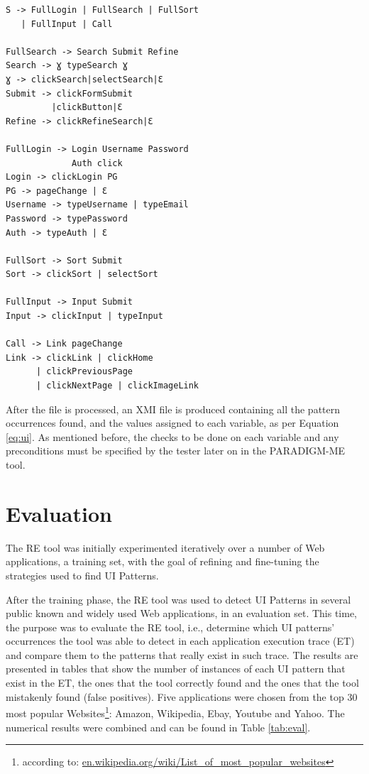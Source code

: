 \documentclass[conference]{IEEEtran}
\begin{document}
\begin{lstlisting}
S -> FullLogin | FullSearch | FullSort 
   | FullInput | Call

FullSearch -> Search Submit Refine
Search -> Ɣ typeSearch Ɣ
Ɣ -> clickSearch|selectSearch|Ɛ
Submit -> clickFormSubmit
         |clickButton|Ɛ
Refine -> clickRefineSearch|Ɛ

FullLogin -> Login Username Password 
             Auth click
Login -> clickLogin PG
PG -> pageChange | Ɛ
Username -> typeUsername | typeEmail
Password -> typePassword
Auth -> typeAuth | Ɛ

FullSort -> Sort Submit
Sort -> clickSort | selectSort

FullInput -> Input Submit
Input -> clickInput | typeInput

Call -> Link pageChange
Link -> clickLink | clickHome 
      | clickPreviousPage 
      | clickNextPage | clickImageLink
\end{lstlisting}

After the file is processed, an XMI file is produced containing all the pattern occurrences found, and the values assigned to each variable, as per Equation \ref{eq:ui}. As mentioned before, the checks to be done on each variable and any preconditions must be specified by the tester later on in the PARADIGM-ME tool.

\section{Evaluation}\label{sec:eval}
The RE tool was initially experimented iteratively over a number of Web applications, a training set, with the goal of refining and fine-tuning the strategies used to find UI Patterns.

After the training phase, the RE tool was used to detect UI Patterns in several public known and widely used Web applications, in an evaluation set. This time, the purpose was to evaluate the RE tool, i.e., determine which UI patterns’ occurrences the tool was able to detect in each application execution trace (ET) and compare them to the patterns that really exist in such trace. The results
are presented in tables that show the number of instances of each UI pattern that exist in the ET, the ones that the tool correctly found and the ones that the tool mistakenly found (false positives).
Five applications were chosen from the top 30 most popular Websites\footnote{according to: \url{en.wikipedia.org/wiki/List_of_most_popular_websites‎}}: Amazon, Wikipedia, Ebay, Youtube and Yahoo. The numerical results were combined and can be found in Table \ref{tab:eval}.
\end{document}

